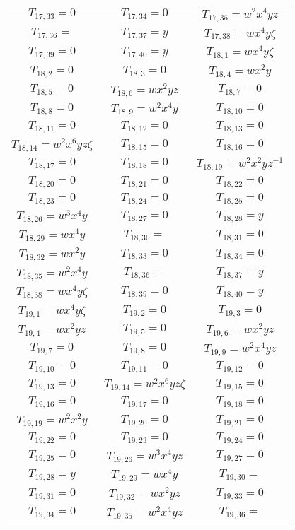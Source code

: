 \documentclass[12pt]{memoireuqam1.3}
\begin{document}
\begin{longtable}{|c|c|c|}
$T_{17,33}= 0$&
$T_{17,34}= 0$&
$T_{17,35}= w^2x^4yz$\\
$T_{17,36}= $&
$T_{17,37}= y$&
$T_{17,38}= wx^4y\zeta$\\
$T_{17,39}= 0$&
$T_{17,40}= y$&
$T_{18,1}= wx^4y\zeta$\\
$T_{18,2}= 0$&
$T_{18,3}= 0$&
$T_{18,4}= wx^2y$\\
$T_{18,5}= 0$&
$T_{18,6}= wx^2yz$&
$T_{18,7}= 0$\\
$T_{18,8}= 0$&
$T_{18,9}= w^2x^4y$&
$T_{18,10}= 0$\\
$T_{18,11}= 0$&
$T_{18,12}= 0$&
$T_{18,13}= 0$\\
$T_{18,14}= w^2x^6yz\zeta$&
$T_{18,15}= 0$&
$T_{18,16}= 0$\\
$T_{18,17}= 0$&
$T_{18,18}= 0$&
$T_{18,19}= w^2x^2yz^{-1}$\\
$T_{18,20}= 0$&
$T_{18,21}= 0$&
$T_{18,22}= 0$\\
$T_{18,23}= 0$&
$T_{18,24}= 0$&
$T_{18,25}= 0$\\
$T_{18,26}= w^3x^4y$&
$T_{18,27}= 0$&
$T_{18,28}= y$\\
$T_{18,29}= wx^4y$&
$T_{18,30}= $&
$T_{18,31}= 0$\\
$T_{18,32}= wx^2y$&
$T_{18,33}= 0$&
$T_{18,34}= 0$\\
$T_{18,35}= w^2x^4y$&
$T_{18,36}= $&
$T_{18,37}= y$\\
$T_{18,38}= wx^4y\zeta$&
$T_{18,39}= 0$&
$T_{18,40}= y$\\
$T_{19,1}= wx^4y\zeta$&
$T_{19,2}= 0$&
$T_{19,3}= 0$\\
$T_{19,4}= wx^2yz$&
$T_{19,5}= 0$&
$T_{19,6}= wx^2yz$\\
$T_{19,7}= 0$&
$T_{19,8}= 0$&
$T_{19,9}= w^2x^4yz$\\
$T_{19,10}= 0$&
$T_{19,11}= 0$&
$T_{19,12}= 0$\\
$T_{19,13}= 0$&
$T_{19,14}= w^2x^6yz\zeta$&
$T_{19,15}= 0$\\
$T_{19,16}= 0$&
$T_{19,17}= 0$&
$T_{19,18}= 0$\\
$T_{19,19}= w^2x^2y$&
$T_{19,20}= 0$&
$T_{19,21}= 0$\\
$T_{19,22}= 0$&
$T_{19,23}= 0$&
$T_{19,24}= 0$\\
$T_{19,25}= 0$&
$T_{19,26}= w^3x^4yz$&
$T_{19,27}= 0$\\
$T_{19,28}= y$&
$T_{19,29}= wx^4y$&
$T_{19,30}= $\\
$T_{19,31}= 0$&
$T_{19,32}= wx^2yz$&
$T_{19,33}= 0$\\
$T_{19,34}= 0$&
$T_{19,35}= w^2x^4yz$&
$T_{19,36}= $\\

\end{longtable}
\end{document}
